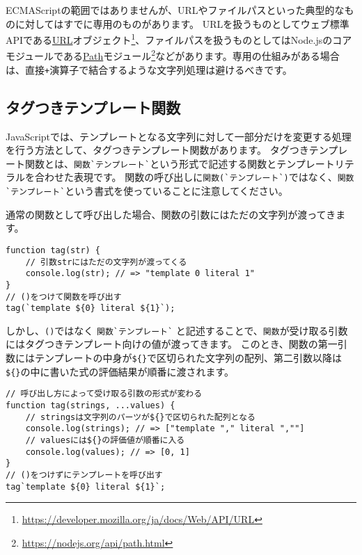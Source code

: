 ECMAScriptの範囲ではありませんが、URLやファイルパスといった典型的なものに対してはすでに専用のものがあります。
URLを扱うものとしてウェブ標準APIである\href{https://developer.mozilla.org/ja/docs/Web/API/URL}{URL}オブジェクト\footnote{\url{https://developer.mozilla.org/ja/docs/Web/API/URL}}、ファイルパスを扱うものとしてはNode.jsのコアモジュールである\href{https://nodejs.org/api/path.html}{Path}モジュール\footnote{\url{https://nodejs.org/api/path.html}}などがあります。専用の仕組みがある場合は、直接\texttt{+}演算子で結合するような文字列処理は避けるべきです。

\hypertarget{tagged-template-function}{%
\subsection[タグつきテンプレート関数]{タグつきテンプレート関数\,\protect{}}\label{tagged-template-function}}

JavaScriptでは、テンプレートとなる文字列に対して一部分だけを変更する処理を行う方法として、タグつきテンプレート関数があります。
タグつきテンプレート関数とは、\texttt{関数}\lstinline{`}\texttt{テンプレート}\lstinline{`}という形式で記述する関数とテンプレートリテラルを合わせた表現です。
関数の呼び出しに\texttt{関数}\lstinline{(`}\texttt{テンプレート}\lstinline{`)}ではなく、\texttt{関数}\lstinline{`}\texttt{テンプレート}\lstinline{`}という書式を使っていることに注意してください。

通常の関数として呼び出した場合、関数の引数にはただの文字列が渡ってきます。

\begin{lstlisting}
function tag(str) {
    // 引数strにはただの文字列が渡ってくる
    console.log(str); // => "template 0 literal 1"
}
// ()をつけて関数を呼び出す
tag(`template ${0} literal ${1}`);
\end{lstlisting}

しかし、\texttt{()}ではなく
\texttt{関数}\lstinline{`}\texttt{テンプレート}\lstinline{`}
と記述することで、\texttt{関数}が受け取る引数にはタグつきテンプレート向けの値が渡ってきます。
このとき、関数の第一引数にはテンプレートの中身が\texttt{\$\{\}}で区切られた文字列の配列、第二引数以降は\texttt{\$\{\}}の中に書いた式の評価結果が順番に渡されます。

\begin{lstlisting}
// 呼び出し方によって受け取る引数の形式が変わる
function tag(strings, ...values) {
    // stringsは文字列のパーツが${}で区切られた配列となる
    console.log(strings); // => ["template "," literal ",""]
    // valuesには${}の評価値が順番に入る
    console.log(values); // => [0, 1]
}
// ()をつけずにテンプレートを呼び出す
tag`template ${0} literal ${1}`;
\end{lstlisting}

